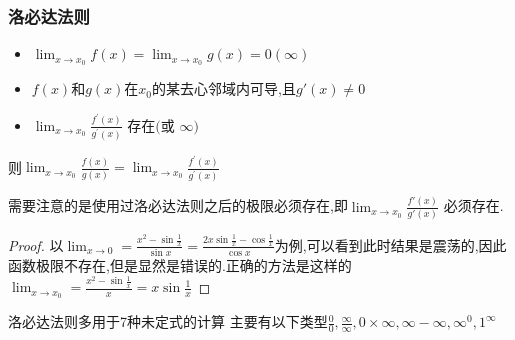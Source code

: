 \documentclass[12pt, a4paper, oneside, UTF8]{ctexbook}  %
\begin{document}
\subsubsection{洛必达法则}
\begin{defn}{}{}
    \begin{itemize}
        \item $\lim_{x\to x_0}f(x)=\lim_{x\to x_0}g(x)=0(\infty)$
        \item $f(x)$和$g(x)$在$x_0$的某去心邻域内可导,且$g'(x) \neq 0$
        \item $\lim_{x\to x_0}\frac{f^{\prime}(x)}{g^{\prime}(x)}\text{ 存在(或 }\infty)$
    \end{itemize}
    则$\lim_{x\to x_{0}}\frac{f(x)}{g(x)}=\lim_{x\to x_{0}}\frac{f^{'}(x)}{g^{'}(x)}$
\end{defn}
需要注意的是使用过洛必达法则之后的极限必须存在,即$\lim _{x \to x_0}\frac{f'(x)}{g'(x)}$ 必须存在.
\begin{proof}
    以$\lim _{x \to 0}=\frac{x^2-\sin \frac{1}{x}}{\sin x}=\frac{2x\sin \frac{1}{x}-\cos\frac{1}{x}}{\cos x}$为例,可以看到此时结果是震荡的,因此函数极限不存在,但是显然是错误的.正确的方法是这样的$\lim _{x \to x_0}=\frac{x^2-\sin \frac{1}{x}}{x}=x\sin \frac{1}{x}$
\end{proof}
洛必达法则多用于7种未定式的计算
主要有以下类型$\frac{0}{0},\frac{\infty}{\infty},0 \times \infty,\infty -\infty,\infty ^0,1^\infty$
\end{document}
